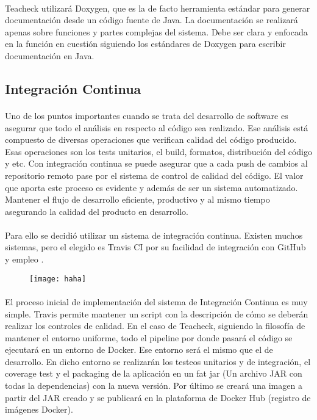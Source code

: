 \paragraph{}
Teacheck utilizará Doxygen, que es la de facto herramienta estándar para generar documentación desde un código fuente de Java. La documentación se realizará apenas sobre funciones y partes complejas del sistema. Debe ser clara y enfocada en la función en cuestión siguiendo los estándares de Doxygen para escribir documentación en Java.

\subsection{Integración Continua}
\paragraph{}
Uno de los puntos importantes cuando se trata del desarrollo de software es asegurar que todo el análisis en respecto al código sea realizado. Ese análisis está compuesto de diversas operaciones que verifican calidad del código producido. Esas operaciones son los tests unitarios, el build, formatos, distribución del código y etc. Con integración continua se puede asegurar que a cada push de cambios al repositorio remoto pase por el sistema de control de calidad del código. El valor que aporta este proceso es evidente y además de ser un sistema automatizado. Mantener el flujo de desarrollo eficiente, productivo y al mismo tiempo asegurando la calidad del producto en desarrollo.

\paragraph{}
Para ello se decidió utilizar un sistema de integración continua. Existen muchos sistemas, pero el elegido es Travis CI por su facilidad de integración con GitHub y empleo
.
\begin{figure}
  \texttt{[image: haha]}
\end{figure}
\paragraph{}
El proceso inicial de implementación del sistema de Integración Continua es muy simple. Travis permite mantener un script con la descripción de cómo se deberán realizar los controles de calidad. En el caso de Teacheck, siguiendo la filosofía de mantener el entorno uniforme, todo el pipeline por donde pasará el código se ejecutará en un entorno de Docker. Ese entorno será el mismo que el de desarrollo. En dicho entorno se realizarán los testeos unitarios y de integración, el coverage test y el packaging de la aplicación en un fat jar (Un archivo JAR con todas la dependencias) con la nueva versión. Por último se creará una imagen a partir del JAR creado y se publicará en la plataforma de Docker Hub (registro de imágenes Docker). 

